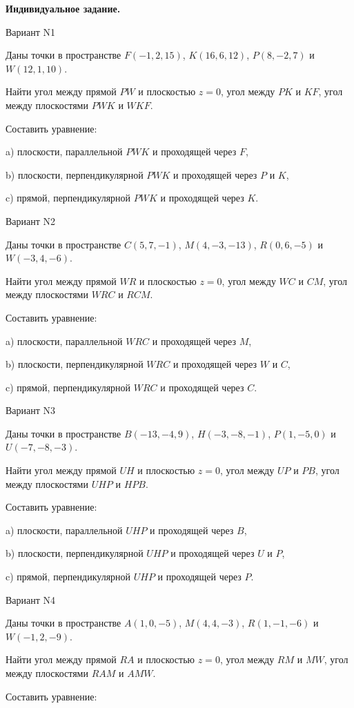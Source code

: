 \documentclass[11pt]{report}
\begin{document}
\pagestyle{empty}

{\bf Индивидуальное задание.}

 Вариант N1

Даны точки в пространстве
$F(-1, 2, 15)$, $K(16, 6, 12)$, $P(8, -2, 7)$ и
$W(12, 1, 10)$.

Найти угол между прямой $PW$ и плоскостью $z = 0$, угол между $PK$ и $KF$, угол между плоскостями $PWK$ 
и $WKF$.

Составить уравнение: 

a) плоскости, параллельной $PWK$ и проходящей через $F$,

b) плоскости, перпендикулярной $PWK$ и проходящей через $P$ и $K$,

c) прямой, перпендикулярной $PWK$ и проходящей через $K$.

Вариант N2

Даны точки в пространстве
$C(5, 7, -1)$, $M(4, -3, -13)$, $R(0, 6, -5)$ и
$W(-3, 4, -6)$.

Найти угол между прямой $WR$ и плоскостью $z = 0$, угол между $WC$ и $CM$, угол между плоскостями $WRC$ 
и $RCM$.

Составить уравнение: 

a) плоскости, параллельной $WRC$ и проходящей через $M$,

b) плоскости, перпендикулярной $WRC$ и проходящей через $W$ и $C$,

c) прямой, перпендикулярной $WRC$ и проходящей через $C$.

Вариант N3

Даны точки в пространстве
$B(-13, -4, 9)$, $H(-3, -8, -1)$, $P(1, -5, 0)$ и
$U(-7, -8, -3)$.

Найти угол между прямой $UH$ и плоскостью $z = 0$, угол между $UP$ и $PB$, угол между плоскостями $UHP$ 
и $HPB$.

Составить уравнение: 

a) плоскости, параллельной $UHP$ и проходящей через $B$,

b) плоскости, перпендикулярной $UHP$ и проходящей через $U$ и $P$,

c) прямой, перпендикулярной $UHP$ и проходящей через $P$.

Вариант N4

Даны точки в пространстве
$A(1, 0, -5)$, $M(4, 4, -3)$, $R(1, -1, -6)$ и
$W(-1, 2, -9)$.

Найти угол между прямой $RA$ и плоскостью $z = 0$, угол между $RM$ и $MW$, угол между плоскостями $RAM$ 
и $AMW$.

Составить уравнение: 
\end{document}
